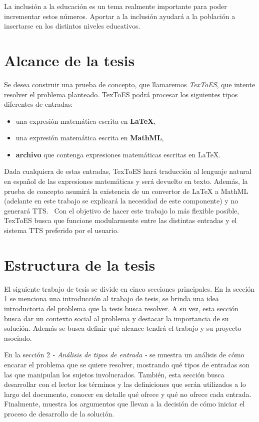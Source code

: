 La inclusión a la educación es un tema realmente importante para poder incrementar estos números. Aportar a la inclusión ayudará a la población
a insertarse en los distintos niveles educativos.


\section{Alcance de la tesis}

Se desea construir una prueba de concepto, que llamaremos \textit{TexToES},  que intente resolver el problema planteado.
TexToES podrá procesar los siguientes tipos diferentes de entradas:
\begin{itemize}
\item una expresión matemática escrita en \textbf{\LaTeX{}},
\item una expresión matemática escrita en \textbf{MathML},
\item \textbf{archivo} que contenga expresiones matemáticas escritas en \LaTeX{}.
\end{itemize}
Dada cualquiera de estas entradas, TexToES hará traducción al lenguaje natural en español de las expresiones matemáticas y será devuelto en texto.
Además, la prueba de concepto asumirá la existencia de un convertor de LaTeX a MathML (adelante en este trabajo se explicará la necesidad de este componente) y no generará TTS. \
Con el objetivo de hacer este trabajo lo más flexible posible, TexToES busca que funcione modularmente entre las distintas entradas y el sistema TTS preferido por el usuario.


\section{Estructura de la tesis}

El siguiente trabajo de tesis se divide en cinco secciones principales. En la sección 1  se menciona una introducción al trabajo de tesis, se brinda una idea introductoria del problema que la tesis busca resolver. A su vez, esta sección busca dar un contexto social al problema y destacar la importancia de su solución. Además se busca definir qué alcance tendrá el trabajo y su proyecto asociado.

En la sección 2 \textit{- Análisis de tipos de entrada -} se muestra un análisis de cómo encarar el problema que se quiere resolver, mostrando qué tipos de entradas son las que manipulan los sujetos involucrados. También, esta sección busca desarrollar con el lector los términos y las definiciones que serán utilizados a lo largo del documento, conocer en detalle qué ofrece y qué no ofrece cada entrada. Finalmente, muestra los argumentos que llevan a la decisión de cómo iniciar el proceso de desarrollo de la solución.

